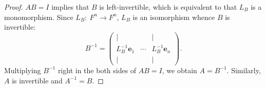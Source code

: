 \begin{proof}
$AB=I$ implies that $B$ is left-invertible, which is equivalent to that $L_B$ is a monomorphism. Since $L_B:~F^n\to F^n$, $L_B$ is an isomorphism whence $B$ is invertible: $$B^{-1} = \begin{pmatrix} | & & | \\ L_B^{-1}\mathbf e_1 &\cdots & L_B^{-1}\mathbf e_n \\ | & & | \end{pmatrix}. $$ Multiplying $B^{-1}$ right in the both sides of $AB=I$, we obtain $A=B^{-1}.$ Similarly, $A$ is invertible and $A^{-1} = B.$
\end{proof}

